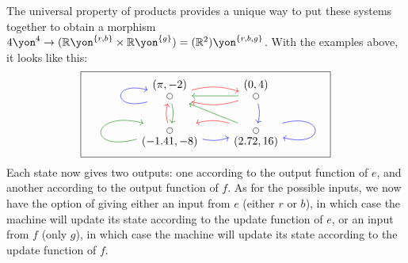\documentclass[Book-Poly]{subfiles}
\begin{document}
\begin{example}
The universal property of products provides a unique way to put these systems together to obtain a morphism $4\yon^4\to(\rr\yon^{\{r,b\}}\times \rr\yon^{\{g\}})=(\rr^2)\yon^{\{r,b,g\}}$. With the examples above, it looks like this:
\[
\begin{tikzpicture}
	\node[draw] (1) {
  \begin{tikzcd}
  	\LMO{(\pi,-2)}\ar[r, bend left=15pt, red]\ar[loop left, blue]\ar[d, bend left=15pt, green!50!black]&
  	\LMO{(0,4)}\ar[l, bend left=15pt, red]\ar[d, bend left=15pt, blue]\ar[l, green!50!black]\\
  	\LMO[under]{(-1.41,-8)}\ar[u,bend left=15pt, red]\ar[r, bend right=15pt, blue]\ar[loop left, green!50!black]&
  	\LMO[under]{(2.72,16)}\ar[l, bend right=15pt, red]\ar[loop right=15pt, blue]\ar[ul, green!50!black]
  \end{tikzcd}
  };
\end{tikzpicture}
\]
Each state now gives two outputs: one according to the output function of $e$, and another according to the output function of $f$.
As for the possible inputs, we now have the option of giving either an input from $e$ (either $r$ or $b$), in which case the machine will update its state according to the update function of $e$, or an input from $f$ (only $g$), in which case the machine will update its state according to the update function of $f$.
\end{example}
\end{document}
